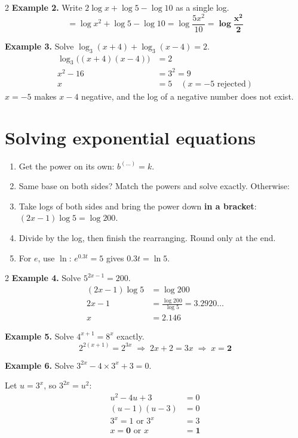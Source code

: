 \documentclass[11pt]{article}
\begin{document}
\begin{multicols}{2}
\textbf{Example 2.} Write $2\log x + \log 5 - \log 10$ as a single log.
\[ = \log x^{2} + \log 5 - \log 10 = \log\frac{5x^{2}}{10} = \mathbf{\log\frac{x^{2}}{2}} \]
\columnbreak

\textbf{Example 3.} Solve $\log_{3}(x+4) + \log_{3}(x-4) = 2$.
\begin{align*}
\log_{3}\bigl((x+4)(x-4)\bigr) &= 2\\
x^{2} - 16 &= 3^{2} = 9\\
x &= 5 \quad (x = -5 \text{ rejected})
\end{align*}
$x = -5$ makes $x - 4$ negative, and the log of a negative number does not exist.
\end{multicols}

\section{Solving exponential equations}\label{h2:solve}
\begin{keybox}[title={Write it in this order (unknown in the power)}]
\begin{enumerate}
\item Get the power on its own: $b^{(\ldots)} = k$.
\item Same base on both sides? Match the powers and solve exactly. Otherwise:
\item Take logs of both sides and bring the power down \textbf{in a bracket}: $(2x-1)\log 5 = \log 200$.
\item Divide by the log, then finish the rearranging. Round only at the end.
\item For $e$, use $\ln$: $e^{0.3t} = 5$ gives $0.3t = \ln 5$.
\end{enumerate}
\end{keybox}

\begin{multicols}{2}
\textbf{Example 4.} Solve $5^{2x-1} = 200$.
\begin{align*}
(2x-1)\log 5 &= \log 200\\
2x - 1 &= \frac{\log 200}{\log 5} = 3.2920\ldots\\
x &= \mathbf{2.146}
\end{align*}

\textbf{Example 5.} Solve $4^{x+1} = 8^{x}$ exactly.
\[ 2^{2(x+1)} = 2^{3x} \;\Rightarrow\; 2x + 2 = 3x \;\Rightarrow\; x = \mathbf{2} \]
\columnbreak

\textbf{Example 6.} Solve $3^{2x} - 4\times 3^{x} + 3 = 0$.\par
Let $u = 3^{x}$, so $3^{2x} = u^{2}$:
\begin{align*}
u^{2} - 4u + 3 &= 0\\
(u-1)(u-3) &= 0\\
3^{x} = 1 \text{ or } 3^{x} &= 3\\
x = \mathbf{0} \text{ or } x &= \mathbf{1}
\end{align*}
\end{multicols}
\end{document}
